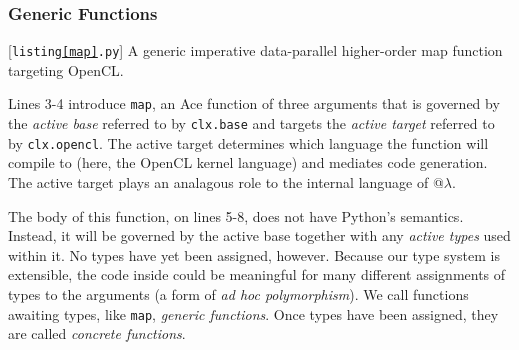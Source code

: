 \subsubsection{Generic Functions}\label{genfn}
\begin{codelisting}

\caption{[\texttt{listing\ref{map}.py}] A generic imperative data-parallel higher-order map function targeting OpenCL.}
\label{map}
\end{codelisting}
%
%

Lines 3-4 introduce \verb|map|, an Ace function of three arguments that is governed by the \emph{active base} referred to by \verb|clx.base| and targets the \emph{active target} referred to by \verb|clx.opencl|. The active target determines which language the function will compile to (here, the OpenCL kernel language) and mediates code generation. The active target plays an analagous role to the internal language of @$\lambda$.

The body of this function, on lines 5-8, does not have Python's semantics. Instead, it will be governed by the active base together with any \emph{active types} used within it. No  types have yet been assigned, however. Because our type system is extensible, the code inside could be meaningful for many different assignments of types to the arguments (a form of \emph{ad hoc polymorphism}). We call functions awaiting types, like \verb|map|,  \emph{generic functions}. Once types have been assigned, they are called \emph{concrete functions}.

